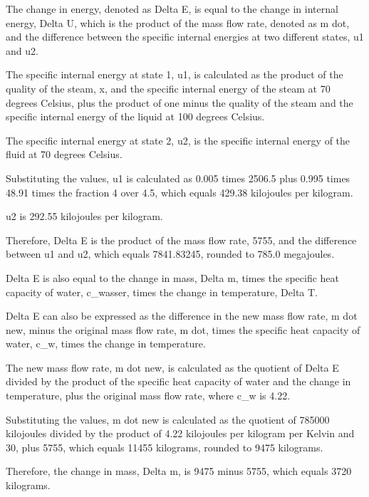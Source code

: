 The change in energy, denoted as Delta E, is equal to the change in internal energy, Delta U, which is the product of the mass flow rate, denoted as m dot, and the difference between the specific internal energies at two different states, u1 and u2.

The specific internal energy at state 1, u1, is calculated as the product of the quality of the steam, x, and the specific internal energy of the steam at 70 degrees Celsius, plus the product of one minus the quality of the steam and the specific internal energy of the liquid at 100 degrees Celsius.

The specific internal energy at state 2, u2, is the specific internal energy of the fluid at 70 degrees Celsius.

Substituting the values, u1 is calculated as 0.005 times 2506.5 plus 0.995 times 48.91 times the fraction 4 over 4.5, which equals 429.38 kilojoules per kilogram.

u2 is 292.55 kilojoules per kilogram.

Therefore, Delta E is the product of the mass flow rate, 5755, and the difference between u1 and u2, which equals 7841.83245, rounded to 785.0 megajoules.

Delta E is also equal to the change in mass, Delta m, times the specific heat capacity of water, c_wasser, times the change in temperature, Delta T.

Delta E can also be expressed as the difference in the new mass flow rate, m dot new, minus the original mass flow rate, m dot, times the specific heat capacity of water, c_w, times the change in temperature.

The new mass flow rate, m dot new, is calculated as the quotient of Delta E divided by the product of the specific heat capacity of water and the change in temperature, plus the original mass flow rate, where c_w is 4.22.

Substituting the values, m dot new is calculated as the quotient of 785000 kilojoules divided by the product of 4.22 kilojoules per kilogram per Kelvin and 30, plus 5755, which equals 11455 kilograms, rounded to 9475 kilograms.

Therefore, the change in mass, Delta m, is 9475 minus 5755, which equals 3720 kilograms.